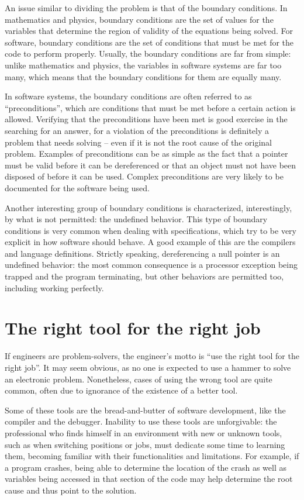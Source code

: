 An issue similar to dividing the problem is that of the boundary conditions. In mathematics and physics, boundary conditions are the set of values for the variables that determine the region of validity of the equations being solved. For software, boundary conditions are the set of conditions that must be met for the code to perform properly. Usually, the boundary conditions are far from simple: unlike mathematics and physics, the variables in software systems are far too many, which means that the boundary conditions for them are equally many.

In software systems, the boundary conditions are often referred to as ``preconditions'', which are conditions that must be met before a certain action is allowed. Verifying that the preconditions have been met is good exercise in the searching for an answer, for a violation of the preconditions is definitely a problem that needs solving -- even if it is not the root cause of the original problem. Examples of preconditions can be as simple as the fact that a pointer must be valid before it can be dereferenced or that an object must not have been disposed of before it can be used. Complex preconditions are very likely to be documented for the software being used.

Another interesting group of boundary conditions is characterized, interestingly, by what is not permitted: the undefined behavior. This type of boundary conditions is very common when dealing with specifications, which try to be very explicit in how software should behave. A good example of this are the compilers and language definitions. Strictly speaking, dereferencing a null pointer is an undefined behavior: the most common consequence is a processor exception being trapped and the program terminating, but other behaviors are permitted too, including working perfectly.

\section*{The right tool for the right job}

If engineers are problem-solvers, the engineer’s motto is ``use the right tool for the right job''. It may seem obvious, as no one is expected to use a hammer to solve an electronic problem. Nonetheless, cases of using the wrong tool are quite common, often due to ignorance of the existence of a better tool.

Some of these tools are the bread-and-butter of software development, like the compiler and the debugger. Inability to use these tools are unforgivable: the professional who finds himself in an environment with new or unknown tools, such as when switching positions or jobs, must dedicate some time to learning them, becoming familiar with their functionalities and limitations. For example, if a program crashes, being able to determine the location of the crash as well as variables being accessed in that section of the code may help determine the root cause and thus point to the solution.


